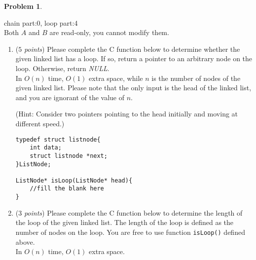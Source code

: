 \documentclass[12pt,a4paper]{report}
\newcommand{\points}[1]{ ($#1$ \textit{points}) }
\theoremstyle{definition}
\newtheorem{problem}{\textbf{Problem}}
\theoremstyle{definition}
\begin{document}
\begin{problem}
\begin{enumerate}[label=\arabic*.]
        chain part:0, loop part:4\\

        Both $A$ and $B$ are read-only, you cannot modify them.
    \begin{enumerate}[label=\alph*.]
        \item \points{5}Please complete the C function below to determine whether the given linked list has a loop. If so, return a pointer to an arbitrary node on the loop.  Otherwise, return \textit{NULL}.\\
        In $O(n)$ time, $O(1)$ extra space, while $n$ is the number of nodes of the given linked list. Please note that the only input is the head of the linked list, and you are ignorant of the value of $n$.

        (Hint: Consider two pointers pointing to the head initially and moving at different speed.)

\begin{lstlisting}
typedef struct listnode{
    int data;
    struct listnode *next;
}ListNode;

ListNode* isLoop(ListNode* head){
    //fill the blank here
}
\end{lstlisting}

        \item \points{3}Please complete the C function below to determine the length of the loop of the given linked list. The length of the loop is defined as the number of nodes on the loop. You are free to use function \texttt{isLoop()} defined above.\\
        In $O(n)$ time, $O(1)$ extra space.


\end{enumerate}
\end{enumerate}
\end{problem}
\end{document}
